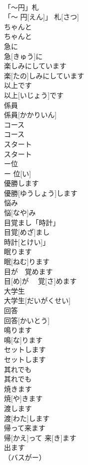 \documentclass[8pt]{extreport}
\begin{document}
\begin{CJK}{UTF8}{min}
\\	「〜円」札	
\\	「〜 円[えん]」 札[さつ]	
\\	ちゃんと	
\\	ちゃんと	
\\	急に	
\\	急[きゅう]に	
\\	楽しみにしています	
\\	楽[たの]しみにしています	
\\	以上です	
\\	以上[いじょう]です	
\\	係員	
\\	係員[かかりいん]	
\\	コース	
\\	コース	
\\	スタート	
\\	スタート	
\\	ー位	
\\	ー 位[い]	
\\	優勝します	
\\	優勝[ゆうしょう]します	
\\	悩み	
\\	悩[なや]み	
\\	目覚まし「時計」	
\\	目覚[めざ]まし
\\	時計[とけい]」	
\\	眠ります	
\\	眠[ねむ]ります	
\\	目が　覚めます	
\\	目[め]が　 覚[さ]めます	
\\	大学生	
\\	大学生[だいがくせい]	
\\	回答	
\\	回答[かいとう]	
\\	鳴ります	
\\	鳴[な]ります	
\\	セットします	
\\	セットします	
\\	其れでも	
\\	其れでも	
\\	焼きます	
\\	焼[や]きます	
\\	渡します	
\\	渡[わた]します	
\\	帰って来ます	
\\	帰[かえ]って 来[き]ます	
\\	出ます
\\	（バスがー）

\end{CJK}
\end{document}
